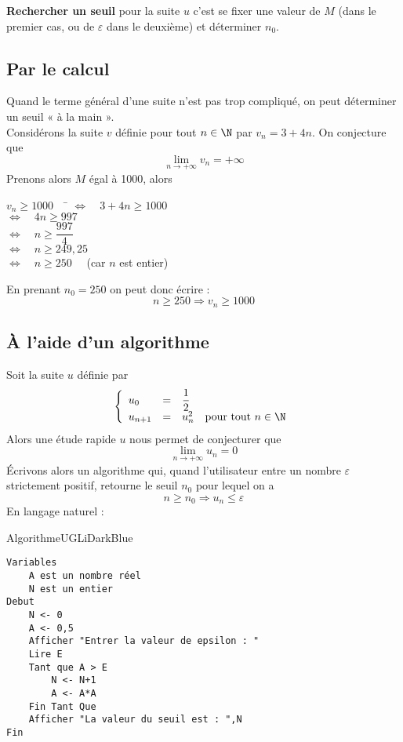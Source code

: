 \documentclass[a4paper,11pt,cours]{nsi} %
\begin{document}
\textbf{Rechercher un seuil} pour la suite $u$ c'est se fixer une valeur de $M$ (dans le premier cas, ou de $\varepsilon$ dans le deuxième) et
déterminer $n_0$.

\subsection{Par le calcul}
Quand le terme général d'une suite n'est pas trop compliqué, on peut déterminer un seuil « à la main ».\\
Considérons la suite $v$ définie pour tout $n\in \N$ par $v_n=3+4n$. On conjecture que $$\lim_{n\to+\infty}v_n=+\infty$$
Prenons alors $M$ égal à 1000, alors
\begin{tabbing}
	$v_n\geqslant 1000\quad$	\=	$\Longleftrightarrow\quad 3+4n\geqslant 1000$\\
	\>	$\Longleftrightarrow\quad 4n\geqslant 997$\\
	\>	$\Longleftrightarrow\quad n\geqslant \dfrac{997}{4}$\\
	\>	$\Longleftrightarrow\quad n\geqslant 249,25$\\
	\>	$\Longleftrightarrow\quad n\geqslant 250\quad$ (car $n$ est entier)
\end{tabbing}
En prenant $n_0=250$ on peut donc écrire :
$$n\geqslant 250 \Longrightarrow v_n\geqslant 1000$$


\subsection{À l'aide d'un algorithme}

Soit la suite $u$ définie par $$\left\{
\begin{array}{llll}
	u_0 & = & \dfrac{1}{2} & \\
	u_{n+1} & = & u_n^2 & \text{pour tout } n\in\N\\
\end{array}
\right. $$
Alors une étude rapide $u$ nous permet de conjecturer que $$\lim_{n\to+\infty}u_n=0$$
\'Ecrivons alors un algorithme qui, quand l'utilisateur entre un nombre $\varepsilon$ strictement positif, retourne le seuil $n_0$
pour lequel on a $$n\geq n_0 \Longrightarrow u_n\leqslant \varepsilon$$
En langage naturel :


\begin{encadrecolore}{Algorithme}{UGLiDarkBlue}
	\begin{verbatim}
Variables
	A est un nombre réel
	N est un entier
Debut
   	N <- 0
   	A <- 0,5
   	Afficher "Entrer la valeur de epsilon : "
   	Lire E
   	Tant que A > E 
      	N <- N+1
      	A <- A*A
   	Fin Tant Que
   	Afficher "La valeur du seuil est : ",N
Fin
	\end{verbatim}	
\end{encadrecolore}
\end{document}
